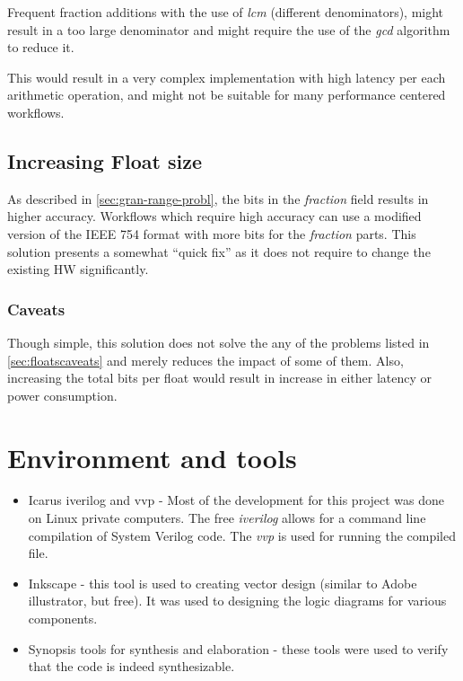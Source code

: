 \documentclass[10pt]{article}
\begin{document}
Frequent fraction additions with the use of \textit{lcm} (different
denominators), might result in a too large denominator and might require the use
of the \textit{gcd} algorithm to reduce it.

This would result in a very complex implementation with high latency per each
arithmetic operation, and might not be suitable for many performance centered workflows.

\subsection{Increasing Float size}\label{sec:increasefloat}

As described in \autoref{sec:gran-range-probl}, the bits in the
\textit{fraction} field results in higher accuracy. Workflows which require high
accuracy can use a modified version of the IEEE 754 format with more bits for
the \textit{fraction} parts. This solution presents a somewhat ``quick fix'' as
it does not require to change the existing HW significantly.

\subsubsection{Caveats}\label{sec:caveats-1}

Though simple, this solution does not solve the any of the problems listed in
\autoref{sec:floatscaveats} and merely reduces the impact of some of them.
Also, increasing the total bits per float would result in increase in either
latency or power consumption.

\section{Environment and tools}\label{sec:environment-tools}

\begin{itemize}
  \item Icarus iverilog and vvp - Most of the development for this project was
  done on Linux private computers. The free \textit{iverilog} allows for a
  command line compilation of System Verilog code. The \textit{vvp} is used for
  running the compiled file.
  \item Inkscape - this tool is used to creating vector design (similar to Adobe
  illustrator, but free). It was used to designing the logic diagrams for
  various components.
  \item Synopsis tools for synthesis and elaboration - these tools were used to
  verify that the code is indeed synthesizable.
\end{itemize}
\end{document}
